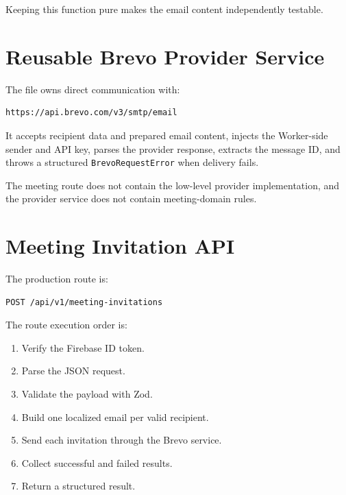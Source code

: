 \documentclass[11pt,a4paper,oneside]{report}
\begin{document}
Keeping this function pure makes the email content independently testable.

\section{Reusable Brevo Provider Service}

The file  owns direct communication with:

\begin{lstlisting}
https://api.brevo.com/v3/smtp/email
\end{lstlisting}

It accepts recipient data and prepared email content, injects the Worker-side sender and API key, parses the provider response, extracts the message ID, and throws a structured \texttt{BrevoRequestError} when delivery fails.

The meeting route does not contain the low-level provider implementation, and the provider service does not contain meeting-domain rules.

\section{Meeting Invitation API}

The production route is:

\begin{lstlisting}
POST /api/v1/meeting-invitations
\end{lstlisting}

The route execution order is:

\begin{enumerate}
  \item Verify the Firebase ID token.
  \item Parse the JSON request.
  \item Validate the payload with Zod.
  \item Build one localized email per valid recipient.
  \item Send each invitation through the Brevo service.
  \item Collect successful and failed results.
  \item Return a structured result.
\end{enumerate}
\end{document}
